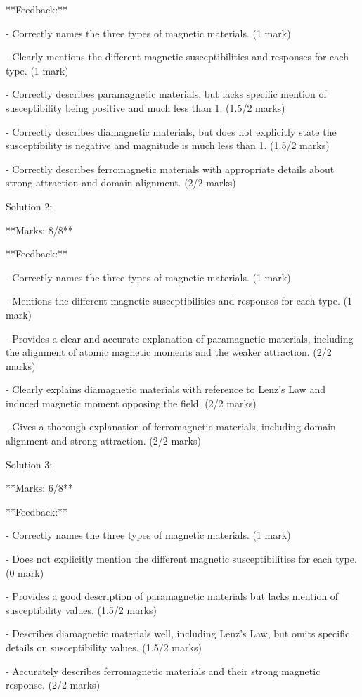 \documentclass[a4paper,11pt]{article}
\begin{document}
**Feedback:**

- Correctly names the three types of magnetic materials. (1 mark)

- Clearly mentions the different magnetic susceptibilities and responses for each type. (1 mark)

- Correctly describes paramagnetic materials, but lacks specific mention of susceptibility being positive and much less than 1. (1.5/2 marks)

- Correctly describes diamagnetic materials, but does not explicitly state the susceptibility is negative and magnitude is much less than 1. (1.5/2 marks)

- Correctly describes ferromagnetic materials with appropriate details about strong attraction and domain alignment. (2/2 marks)

Solution 2:

**Marks: 8/8**

**Feedback:**

- Correctly names the three types of magnetic materials. (1 mark)

- Mentions the different magnetic susceptibilities and responses for each type. (1 mark)

- Provides a clear and accurate explanation of paramagnetic materials, including the alignment of atomic magnetic moments and the weaker attraction. (2/2 marks)

- Clearly explains diamagnetic materials with reference to Lenz's Law and induced magnetic moment opposing the field. (2/2 marks)

- Gives a thorough explanation of ferromagnetic materials, including domain alignment and strong attraction. (2/2 marks)

Solution 3:

**Marks: 6/8**

**Feedback:**

- Correctly names the three types of magnetic materials. (1 mark)

- Does not explicitly mention the different magnetic susceptibilities for each type. (0 mark)

- Provides a good description of paramagnetic materials but lacks mention of susceptibility values. (1.5/2 marks)

- Describes diamagnetic materials well, including Lenz's Law, but omits specific details on susceptibility values. (1.5/2 marks)

- Accurately describes ferromagnetic materials and their strong magnetic response. (2/2 marks)
\end{document}
